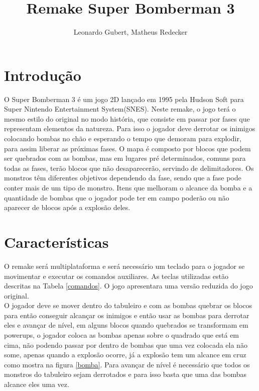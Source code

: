 \documentclass[12pt]{article}
\title{Remake Super Bomberman 3}
\author{Leonardo Gubert\inst{1}, Matheus Redecker\inst{1}}
\begin{document}
 

\maketitle

\section{Introdução}
O Super Bomberman 3 é um jogo 2D lançado em 1995 pela Hudson Soft para Super Nintendo Entertainment System(SNES). Neste remake, o jogo terá o mesmo estilo do original no modo história, que consiste em passar por fases que representam elementos da natureza. Para isso o jogador deve derrotar os inimigos colocando bombas no chão e esperando o tempo que demoram para explodir, para assim liberar as próximas fases. O mapa é composto por blocos que podem ser quebrados com as bombas, mas em lugares pré determinados, comuns para todas as fases, terão blocos que não desaparecerão, servindo de delimitadores. Os monstros têm diferentes objetivos dependendo da fase, sendo que a fase pode conter mais de um tipo de monstro. Itens que melhoram o alcance da bomba e a quantidade de bombas que o jogador pode ter em campo poderão ou não aparecer de blocos após a explosão deles.

\section{Características}
O remake será multiplataforma e será necessário um teclado para o jogador se movimentar e executar os comandos auxiliares. As teclas utilizadas estão descritas na Tabela \ref{comandos}. O jogo apresentara uma versão reduzida do jogo original. \\
O jogador deve se mover dentro do tabuleiro e com as bombas quebrar os blocos para então conseguir alcançar os inimigos e então usar as bombas para derrotar eles e avançar de nível, em alguns blocos quando quebrados se transformam em powerups, o jogador coloca as bombas apenas sobre o quadrado que está em cima, não podendo passar por dentro de bombas que uma vez colocada ela não some, apenas quando a explosão ocorre, já a explosão tem um alcance em cruz como mostra na figura \ref{bomba}. Para avançar de nível é necessário que todos os monstros do tabuleiro sejam derrotados e para isso basta que uma das bombas alcance eles uma vez. 
\end{document}
